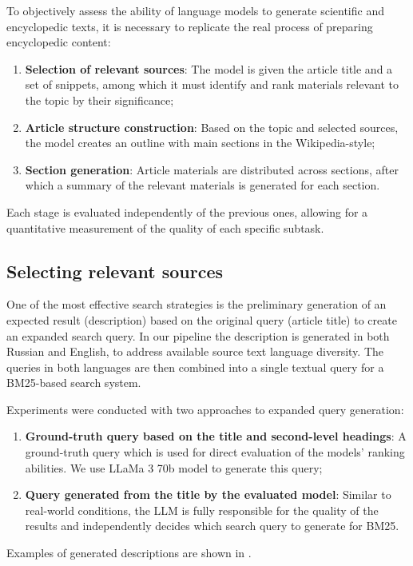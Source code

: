 \documentclass{superfri}
\begin{document}
To objectively assess the ability of language models to generate scientific and encyclopedic texts, it is necessary to replicate the real process of preparing encyclopedic content:
\begin{enumerate}
    \item \textbf{Selection of relevant sources}: The model is given the article title and a set of snippets, among which it must identify and rank materials relevant to the topic by their significance;
    \item \textbf{Article structure construction}: Based on the topic and selected sources, the model creates an outline with main sections in the Wikipedia-style;
    \item \textbf{Section generation}: Article materials are distributed across sections, after which a summary of the relevant materials is generated for each section.
\end{enumerate}
Each stage is evaluated independently of the previous ones, allowing for a quantitative measurement of the quality of each specific subtask.

\subsection{Selecting relevant sources}
One of the most effective search strategies \cite{rerank} is the preliminary generation of an expected result (description) based on the original query (article title) to create an expanded search query.
In our pipeline the description is generated in both Russian and English, to address available source text language diversity.
The queries in both languages are then combined into a single textual query for a BM25-based search system.

Experiments were conducted with two approaches to expanded query generation:
\begin{enumerate}
\item \textbf{Ground-truth query based on the title and second-level headings}: A ground-truth query which is used for direct evaluation of the models' ranking abilities.
We use LLaMa 3 70b model \cite{llama} to generate this query;
\item \textbf{Query generated from the title by the evaluated model}: Similar to real-world conditions, the LLM is fully responsible for the quality of the results and independently decides which search query to generate for BM25.
\end{enumerate}
Examples of generated descriptions are shown in .
\end{document}
